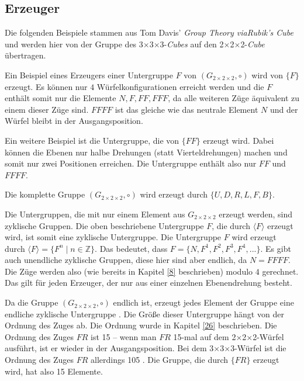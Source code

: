 \documentclass[12pt,a4paper, usenames, dvipsnames]{article}
\theoremstyle{mystyle}
\theoremstyle{definition}
\newcommand{\Gtwo}{\ensuremath{G_{2\times 2\times 2}}}
\newcommand{\Ttwo}{2$\times$2$\times$2-}
\newcommand{\Tthree}{3$\times$3$\times$3-}
\begin{document}
%
%
%
%
%
%
%
%
%
%
%
%
%
%
%
%
%
%
%
%

\subsection*{Erzeuger}

Die folgenden Beispiele stammen aus Tom Davis' \textit{Group Theory viaRubik's Cube} \cite{TD} und werden hier von der Gruppe des \Tthree \textit{Cubes} auf den \Ttwo \textit{Cube} übertragen.


Ein Beispiel eines Erzeugers einer Untergruppe $F$ von $(\Gtwo, \circ)$ wird von $\{ F \}$ erzeugt. Es können nur $4$ Würfelkonfigurationen erreicht werden und die $F$ enthält somit nur die Elemente ${N, F, FF, FFF}$, da alle weiteren Züge äquivalent zu einem dieser Züge sind. $FFFF$ ist das gleiche wie das neutrale Element $N$ und der Würfel bleibt in der Ausgangsposition.


Ein weitere Beispiel ist die Untergruppe, die von $\{FF\}$ erzeugt wird. Dabei können die Ebenen nur halbe Drehungen (statt Vierteldrehungen) machen und somit nur zwei Positionen erreichen. Die Untergruppe enthält also nur $FF$ und $FFFF$.


Die komplette Gruppe $(\Gtwo, \circ)$ wird erzeugt durch $\{U, D, R, L, F, B\}$.

Die Untergruppen, die mit nur einem Element aus $\Gtwo$ erzeugt werden, sind zyklische Gruppen. Die oben beschriebene Untergruppe $F$, die durch $\langle F \rangle$ erzeugt wird, ist somit eine zyklische Untergruppe.
Die Untergruppe $F$ wird erzeugt durch $\langle F \rangle = \{ F^n \mid n \in \mathbb{Z}\}$. Das bedeutet, dass $F = \{N, F^1, F^2, F^3, F^4, ...\}$. Es gibt auch unendliche zyklische Gruppen, diese hier sind aber endlich, da $N = FFFF$. Die Züge werden also (wie bereits in Kapitel \ref{8} beschrieben) modulo $4$ gerechnet.
Das gilt für jeden Erzeuger, der nur aus einer einzelnen Ebenendrehung besteht.


Da die Gruppe $(\Gtwo, \circ)$ endlich ist, erzeugt jedes Element der Gruppe eine endliche zyklische Untergruppe \cite{TD}. Die Größe dieser Untergruppe hängt von der Ordnung des Zuges ab. Die Ordnung wurde in Kapitel \ref{26} beschrieben.
Die Ordnung des Zuges $FR$ ist 15 -- wenn man $FR$ 15-mal auf dem \Ttwo Würfel ausführt, ist er wieder in der Ausgangsposition. Bei dem \Tthree Würfel ist die Ordnung des Zuges $FR$ allerdings 105 \cite{TD}.
Die Gruppe, die durch $\{FR\}$ erzeugt wird, hat also 15 Elemente.
%
%
%
%
%
%
%
%
%
%
%
%
%
%
%
%
%
%
%
\end{document}

